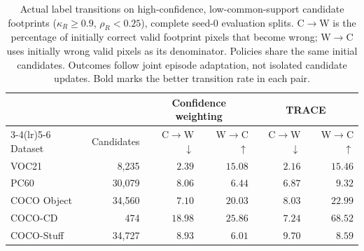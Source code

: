 \begin{table}[t]
\caption{Actual label transitions on high-confidence, low-common-support candidate footprints ($\kappa_R\geq0.9$, $\rho_R<0.25$), complete seed-0 evaluation splits. C$\to$W is the percentage of initially correct valid footprint pixels that become wrong; W$\to$C uses initially wrong valid pixels as its denominator. Policies share the same initial candidates. Outcomes follow joint episode adaptation, not isolated candidate updates. Bold marks the better transition rate in each pair.}
\label{tab:update-risk}
\centering\small
\begin{tabular}{@{}lrrrrr@{}}
\toprule
 & & \multicolumn{2}{c}{Confidence weighting} & \multicolumn{2}{c}{TRACE} \\
\cmidrule(lr){3-4}\cmidrule(lr){5-6}
Dataset & Candidates & C$\to$W $\downarrow$ & W$\to$C $\uparrow$ & C$\to$W $\downarrow$ & W$\to$C $\uparrow$ \\
\midrule
VOC21 & 8,235 & $2.39$ & $15.08$ & $\mathbf{2.16}$ & $\mathbf{15.46}$ \\
PC60 & 30,079 & $8.06$ & $6.44$ & $\mathbf{6.87}$ & $\mathbf{9.32}$ \\
COCO Object & 34,560 & $\mathbf{7.10}$ & $20.03$ & $8.03$ & $\mathbf{22.99}$ \\
COCO-CD & 474 & $18.98$ & $25.86$ & $\mathbf{7.24}$ & $\mathbf{68.52}$ \\
COCO-Stuff & 34,727 & $\mathbf{8.93}$ & $6.01$ & $9.70$ & $\mathbf{8.59}$ \\
\bottomrule
\end{tabular}
\end{table}
